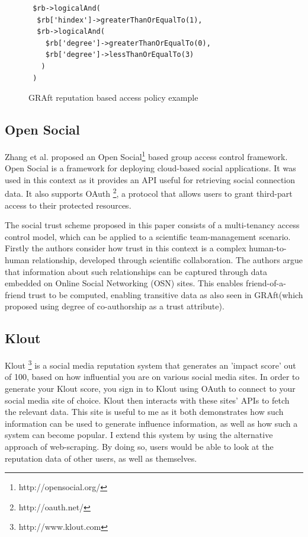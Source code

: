 \begin{center}
\begin{figure}[h!]
\begin{verbatim}
 $rb->logicalAnd(
  $rb['hindex']->greaterThanOrEqualTo(1),
  $rb->logicalAnd(
    $rb['degree']->greaterThanOrEqualTo(0),
    $rb['degree']->lessThanOrEqualTo(3)
   )
 )
\end{verbatim}
\caption{GRAft reputation based access policy example}
\end{figure}
\end{center}


\subsection{Open Social}

Zhang et al. \cite{zhang2012open} proposed an Open Social\footnote{http://opensocial.org/} based group access control framework. Open Social is a framework for deploying cloud-based social applications. It was used in this context as it provides an API useful for retrieving social connection data. It also supports OAuth \footnote{http://oauth.net/}, a protocol that allows users to grant third-part access to their protected resources.

The social trust scheme proposed in this paper consists of a multi-tenancy access control model, which can be applied to a scientific team-management scenario. Firstly the authors consider how trust in this context is a complex human-to-human relationship, developed through scientific collaboration. The authors argue that information about such relationships can be captured through data embedded on Online Social Networking (OSN) sites. This enables friend-of-a-friend trust to be computed, enabling transitive data as also seen in GRAft(which proposed using degree of co-authorship as a trust attribute).


\subsection{Klout}

Klout \footnote{http://www.klout.com} is a social media reputation system that generates an 'impact score' out of 100, based on how influential you are on various social media sites. In order to generate your Klout score, you sign in to Klout using OAuth to connect to your social media site of choice. Klout then interacts with these sites' APIs to fetch the relevant data. This site is useful to me as it both demonstrates how such information can be used to generate influence information, as well as how such a system can become popular. I extend this system by using the alternative approach of web-scraping. By doing so, users would be able to look at the reputation data of other users, as well as themselves. 

